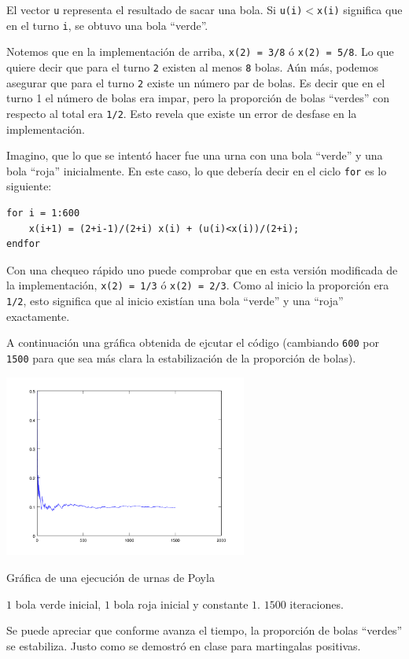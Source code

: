 El vector \texttt{u} representa el resultado de sacar una bola. Si \texttt{u(i)$<$x(i)} significa que en el turno \texttt{i}, 
se obtuvo una bola ``verde''.\par\null

Notemos que en la implementación de arriba, \texttt{x(2) = 3/8} ó \texttt{x(2) = 5/8}. Lo que quiere decir que para 
el turno \texttt{2} existen al menos \texttt{8} bolas. Aún más, podemos asegurar que para el turno \texttt{2} existe 
un número par de bolas. Es decir que en el turno 1 el número de bolas era impar, pero la proporción de bolas ``verdes'' 
con respecto al total era \texttt{1/2}. Esto revela que existe un error de desfase en la implementación.\par\null 

Imagino, que lo que se intentó hacer fue una urna con una bola ``verde'' y una bola ``roja'' inicialmente. En este caso, lo que 
debería decir en el ciclo \texttt{for} es lo siguiente:\par\null

\begin{verbatim}
for i = 1:600
    x(i+1) = (2+i-1)/(2+i) x(i) + (u(i)<x(i))/(2+i);
endfor
\end{verbatim}\par\null

Con una chequeo rápido uno puede comprobar que en esta versión modificada de la implementación, 
\texttt{x(2) = 1/3} ó \texttt{x(2) = 2/3}. Como al inicio la proporción era \texttt{1/2}, esto 
significa que al inicio existían una bola ``verde'' y una ``roja'' exactamente.\par\null

A continuación una gráfica obtenida de ejcutar el código (cambiando \texttt{600} por \texttt{1500} para que 
sea más clara la estabilización de la proporción de bolas).

\begin{center}
    \includegraphics[width=8cm]{tarea2/problema2_2/poyla.PNG}
\end{center}
\begin{center}
    Gráfica de una ejecución de urnas de Poyla \par
    $1$ bola verde inicial, $1$ bola roja inicial y constante $1$. $1500$ iteraciones.
\end{center}\par\null

Se puede apreciar que conforme avanza el tiempo, la proporción de bolas ``verdes'' se estabiliza. Justo como se demostró en clase para
martingalas positivas.